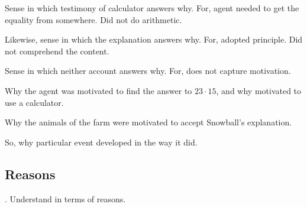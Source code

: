 \begin{note}
  Sense in which testimony of calculator answers why.
  For, agent needed to get the equality from somewhere.
  Did not do arithmetic.

  Likewise, sense in which the explanation answers why.
  For, adopted principle.
  Did not comprehend the content.

  Sense in which neither account answers why.
  For, does not capture motivation.

  Why the agent was motivated to find the answer to \(23 \cdot 15\), and why motivated to use a calculator.

  Why the animals of the farm were motivated to accept Snowball's explanation.

  So, why particular event developed in the way it did.
\end{note}

\subsection{Reasons}
\label{sec:reasons}

\begin{note}
  \qWhy{}.
  Understand in terms of reasons.
\end{note}

